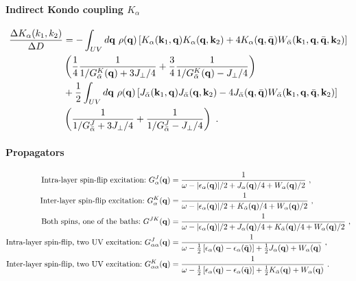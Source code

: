 \paragraph{Indirect Kondo coupling \(K_\alpha\)}
\begin{equation}\begin{aligned}
	\frac{\Delta K_\alpha(k_1, k_2)}{\Delta D} &= -\int_{UV} d{\bf q} ~\rho({\bf q}) \left[K_\alpha({\bf k}_1, {\bf q})K_\alpha({\bf q}, {\bf k}_2) + 4K_\alpha({\bf q}, \bar {\bf q})W_{\bar\alpha}({\bf k}_1, {\bf q}, \bar {\bf q}, {\bf k}_2)\right]\\
											   &\left(\frac{1}{4}\frac{1}{1/ G_{\bar\alpha}^K({\bf q}) + 3J_\perp/4} + \frac{3}{4}\frac{1}{1/ G_{\bar\alpha}^K({\bf q}) - J_\perp/4}\right)\\
	&+ \frac{1}{2}\int_{UV} d{\bf q} ~\rho({\bf q}) \left[J_{\bar\alpha}({\bf k}_1, {\bf q})J_{\bar\alpha}({\bf q}, {\bf k}_2) - 4J_{\bar\alpha}({\bf q}, \bar {\bf q})W_{\bar\alpha}({\bf k}_1, {\bf q}, \bar {\bf q}, {\bf k}_2)\right]\\
	&\left(\frac{1}{1/G_{\bar\alpha}^J + 3J_\perp/4} + \frac{1}{1/G_{\bar\alpha}^J - J_\perp/4}\right)~.
\end{aligned}\end{equation}

\paragraph{Propagators}
\begin{equation}\begin{aligned}
	\text{Intra-layer spin-flip excitation:}~ G_\alpha^J({\bf q}) &= \frac{1}{\omega - |\epsilon_\alpha({\bf q})| / 2 + J_\alpha({\bf q}) / 4 + W_\alpha({\bf q}) / 2}~,\\
	\text{Inter-layer spin-flip excitation:}~ G_\alpha^K({\bf q}) &= \frac{1}{\omega - |\epsilon_{\alpha}({\bf q})| / 2 + K_{\bar\alpha}({\bf q}) / 4 + W_{\alpha}({\bf q}) / 2}~,\\
	\text{Both spins, one of the baths:}~ G^{JK}({\bf q}) &= \frac{1}{\omega - |\epsilon_\alpha({\bf q})| / 2 + J_\alpha({\bf q})/4 + K_{\bar\alpha}({\bf q})/4 + W_\alpha({\bf q})/2}~,\\
	\text{Intra-layer spin-flip, two UV excitation:}~ G^{J}_{\alpha\alpha}({\bf q}) &= \frac{1}{\omega - \frac{1}{2}\left[\epsilon_\alpha({\bf q}) - \epsilon_\alpha(\bar{\bf q})\right] + \frac{1}{2}J_\alpha({\bf q}) + W_\alpha({\bf q})}~,\\
	\text{Inter-layer spin-flip, two UV excitation:}~ G^{K}_{\alpha\alpha}({\bf q}) &= \frac{1}{\omega - \frac{1}{2}\left[\epsilon_\alpha({\bf q}) - \epsilon_\alpha(\bar{\bf q})\right] + \frac{1}{2}K_{\bar\alpha}({\bf q}) + W_\alpha({\bf q})}~.
\end{aligned}\end{equation}

